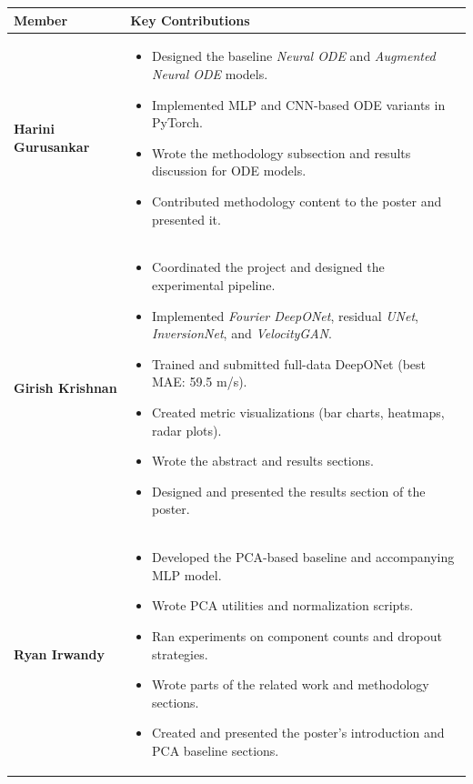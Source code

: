 \documentclass{article}
\begin{document}
\begin{table}[H]
    \centering
    \renewcommand{\arraystretch}{1.4}
    \begin{tabular}{p{3.5cm} p{11cm}}
        \toprule
        \textbf{Member} & \textbf{Key Contributions} \\
        \midrule

        \textbf{Harini Gurusankar} &
        \begin{itemize}
            \item Designed the baseline \emph{Neural ODE} and \emph{Augmented Neural ODE} models.
            \item Implemented MLP and CNN-based ODE variants in PyTorch.
            \item Wrote the methodology subsection and results discussion for ODE models.
            \item Contributed methodology content to the poster and presented it.
        \end{itemize} \\

        \textbf{Girish Krishnan} &
        \begin{itemize}
            \item Coordinated the project and designed the experimental pipeline.
            \item Implemented \emph{Fourier DeepONet}, residual \emph{UNet}, \emph{InversionNet}, and \emph{VelocityGAN}.
            \item Trained and submitted full-data DeepONet (best MAE: 59.5 m/s).
            \item Created metric visualizations (bar charts, heatmaps, radar plots).
            \item Wrote the abstract and results sections.
            \item Designed and presented the results section of the poster.
        \end{itemize} \\

        \textbf{Ryan Irwandy} &
        \begin{itemize}
            \item Developed the PCA-based baseline and accompanying MLP model.
            \item Wrote PCA utilities and normalization scripts.
            \item Ran experiments on component counts and dropout strategies.
            \item Wrote parts of the related work and methodology sections.
            \item Created and presented the poster’s introduction and PCA baseline sections.
        \end{itemize} \\


\end{tabular}
\end{table}
\end{document}
